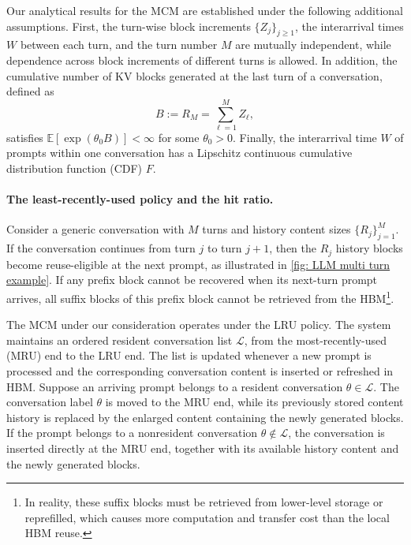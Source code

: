 \documentclass{article}
\theoremstyle{definition}
\newcommand{\E}{\mathbb E}
\begin{document}
Our analytical results for the MCM are established under the following additional assumptions. 
First, the turn-wise block increments $\{Z_{j}\}_{j\geq 1}$, the interarrival times $W$ between each turn, and the turn number $M$ are mutually independent, while dependence across block increments of different turns is allowed. In addition, the cumulative number of KV blocks generated at the last turn of a conversation, defined as
\begin{equation} \label{eq:B}
   B:=R_M=\sum_{\ell=1}^{M} Z_\ell, 
\end{equation}
satisfies $\E [\exp( \theta_0 B)]<\infty$ for some $\theta_0>0$. Finally, the interarrival time $W$ of prompts within one conversation has a Lipschitz continuous cumulative distribution function (CDF) $F$.

\vspace{-0.5em}

\paragraph{The least-recently-used policy and the  hit ratio.}
Consider a generic conversation with $M$ turns and history content sizes $\{R_j\}_{j=1}^M$. If the conversation continues from turn $j$ to turn $j+1$, then the $R_j$ history blocks become reuse-eligible at the next prompt, as illustrated in \cref{fig: LLM multi turn example}. If any prefix block cannot be recovered when its next-turn prompt arrives, all suffix blocks of this prefix block cannot be retrieved from the HBM\footnote{In reality, these suffix blocks must be retrieved from lower-level storage or reprefilled, which causes more computation and transfer cost than the local HBM reuse. }. 

The MCM under our consideration operates under the LRU policy. The system maintains an ordered resident conversation list $\mathcal L$, from the most-recently-used (MRU) end to the LRU end. The list is updated whenever a new prompt is processed and the corresponding conversation content is inserted or refreshed in HBM. Suppose an arriving prompt belongs to a resident conversation $\theta\in\mathcal L$. The conversation label $\theta$ is moved to the MRU end, while its previously stored content history is replaced by the enlarged content containing the newly generated blocks. If the prompt belongs to a nonresident conversation $\theta\notin\mathcal L$, the conversation is inserted directly at the MRU end, together with its available history content and the newly generated blocks.
\end{document}
